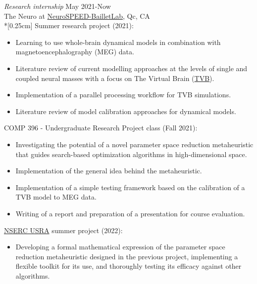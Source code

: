 \documentclass[margin, 10pt]{res} %
\begin{document}
\begin{resume}
		{\sl Research internship} \hfill May 2021-Now\\The Neuro at \href{https://www.neurospeed-bailletlab.org/}{NeuroSPEED-BailletLab}, Qc, CA\\*[0.25cm] 
		Summer research project (2021):
		\vspace*{0.15cm}
		\begin{itemize} \itemsep -2pt %
			\item[\ding{227}] Learning to use whole-brain dynamical models in combination with magnetoencephalography (MEG) data.
			\item Literature review of current modelling approaches at the levels of single and coupled neural masses with a focus on The Virtual Brain (\href{https://www.thevirtualbrain.org/tvb/zwei}{TVB}).
			\item Implementation of a parallel processing workflow for TVB simulations.
			\item Literature review of model calibration approaches for dynamical models.
		\end{itemize}
		\vspace{-0.10cm}
		COMP 396 - Undergraduate Research Project class (Fall 2021):
		\vspace*{0.15cm}
		\begin{itemize} \itemsep -2pt %
			\item[\ding{227}] Investigating the potential of a novel parameter space reduction metaheuristic that guides search-based optimization algorithms in high-dimensional space.
			\item Implementation of the general idea behind the metaheuristic.
			\item Implementation of a simple testing framework based on the calibration of a TVB model to MEG data.
			\item Writing of a report and preparation of a presentation for course evaluation.
		\end{itemize}
		\vspace{-0.10cm}
		\href{https://www.nserc-crsng.gc.ca/students-etudiants/ug-pc/usra-brpc_eng.asp}{NSERC USRA} summer project (2022):
		\vspace*{0.15cm}
		\begin{itemize} \itemsep -2pt %
			\item[\ding{227}] Developing a formal mathematical expression of the parameter space reduction metaheuristic designed in the previous project, implementing a flexible toolkit for its use, and thoroughly testing its efficacy against other algorithms.

\end{itemize}
\end{resume}
\end{document}

